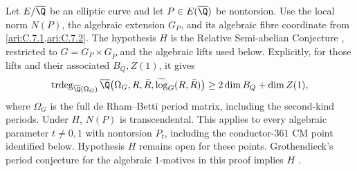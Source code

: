 \begin{proposition}\label{ari:C.7.4}
Let $E/\overline\Q$ be an elliptic curve and let
$P\in E(\overline\Q)$ be nontorsion. Use the local norm $N(P)$,
the algebraic extension $G_P$, and its algebraic fibre coordinate
from \cref{ari:C.7.1,ari:C.7.2}.
The hypothesis $H$ is the Relative Semi-abelian Conjecture
\cite[Conjecture~4.7, p.~18]{bertolin2022}, restricted to
$G=G_P\times G_{\bar P}$ and the algebraic lifts used below.
Explicitly, for those lifts and their associated $B_Q,Z(1)$, it gives
\[
 \operatorname{trdeg}_{\overline\Q(\Omega_G)}
 \overline\Q\bigl(\Omega_G,R,\bar R,
                  \widetilde{\log}_G(R,\bar R)\bigr)
 \geq 2\dim B_Q+\dim Z(1),
\]
where $\Omega_G$ is the full de Rham--Betti period matrix,
including the second-kind periods. Under $H$, $N(P)$ is
transcendental. This applies to every algebraic parameter
$t\ne0,1$ with nontorsion $P_t$, including the conductor-$361$
CM point identified below. Hypothesis $H$ remains open for
these points. Grothendieck's period conjecture for the algebraic
$1$-motives in this proof implies $H$
\cite[Proposition~4.12, pp.~19--20]{bertolin2022}.
\end{proposition}
